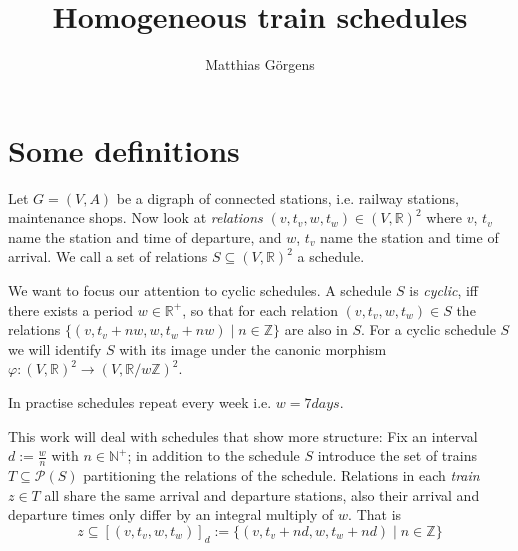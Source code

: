\documentclass{article} %
\begin{document}
\author{Matthias Görgens}
\title{Homogeneous train schedules}
\maketitle
{}




\section{Some definitions}

Let \(G=(V,A)\) be a digraph of connected stations, i.e. railway
stations, maintenance shops.  Now look at \label{relation}
\textit{relations} \((v, t_v, w, t_w) \in \left(V,\mathbb{R}\right)^2
\) where \(v\), \(t_v\) name the station and time of departure, and
\(w\), \(t_v\) name the station and time of arrival.  We call a set of
relations \(S \subseteq \left(V,\mathbb{R}\right)^2\) a schedule.

We want to focus our attention to cyclic schedules.  A schedule \(S\)
is \label{cyclic} \textit{cyclic}, iff there exists a period \(w \in
\mathbb{R}^+\), so that for each relation \((v, t_v, w, t_w) \in S\)
the relations \(\{(v, t_v+n w, w, t_w +n w) \mid n \in \mathbb{Z}\}\)
are also in \(S\).  For a cyclic schedule \(S\) we will identify \(S\)
with its image under the canonic morphism \(\varphi \colon
\left(V,\mathbb{R}\right)^2 \to \left(V,\mathbb{R}/{w
    \mathbb{Z}}\right)^2\).

In practise schedules repeat every week i.e. \(w = 7 \unit{days}\).

This work will deal with schedules that show more structure: Fix an
interval \(d := \frac{w}{n}\) with \(n \in \mathbb{N}^+\); in addition
to the schedule \(S\) introduce the set of trains \(T \subseteq
\mathcal{P}(S)\) partitioning the relations of the schedule.
Relations in each \textit{train} \(z \in T\) all share the same arrival
and departure stations, also their arrival and departure times only
differ by an integral multiply of \(w\).  That is
\begin{equation}
  z \subseteq [(v, t_v, w, t_w )]_d := \{(v, t_v+n d, w, t_w +n d) \mid n \in \mathbb{Z}\}
\end{equation}
\end{document}
